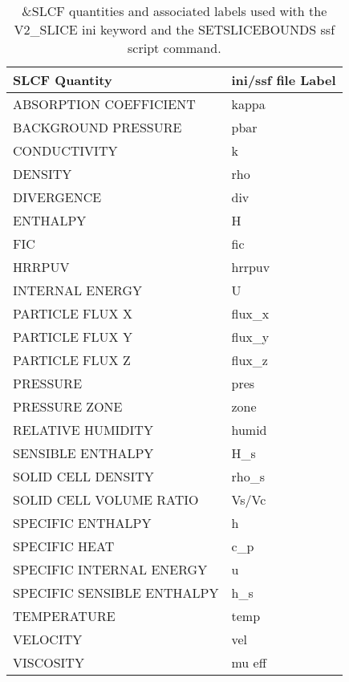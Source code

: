 \begin{table}[bph]
\begin{center}
\caption{\&SLCF quantities and associated labels used with the V2\_SLICE ini keyword and the SETSLICEBOUNDS ssf script command.}
\vspace{0.1in}
\begin{tabular}{|l|l|}
\hline
SLCF Quantity & ini/ssf file Label \\ \hline
 ABSORPTION COEFFICIENT  &   kappa \\ \hline
 BACKGROUND PRESSURE  &   pbar \\ \hline
 CONDUCTIVITY  &   k \\ \hline
 DENSITY  &   rho \\ \hline
 DIVERGENCE  &   div \\ \hline
 ENTHALPY  &   H \\ \hline
 FIC  &   fic \\ \hline
 HRRPUV  &   hrrpuv \\ \hline
 INTERNAL ENERGY  &   U \\ \hline
 PARTICLE FLUX X  &   flux\_x \\ \hline
 PARTICLE FLUX Y  &   flux\_y \\ \hline
 PARTICLE FLUX Z  &   flux\_z \\ \hline
 PRESSURE  &   pres \\ \hline
 PRESSURE ZONE  &   zone \\ \hline
 RELATIVE HUMIDITY  &   humid \\ \hline
 SENSIBLE ENTHALPY  &   H\_s \\ \hline
 SOLID CELL DENSITY  &   rho\_s \\ \hline
 SOLID CELL VOLUME RATIO  &   Vs/Vc \\ \hline
 SPECIFIC ENTHALPY  &   h \\ \hline
 SPECIFIC HEAT  &   c\_p \\ \hline
 SPECIFIC INTERNAL ENERGY  &   u \\ \hline
 SPECIFIC SENSIBLE ENTHALPY  &   h\_s \\ \hline
 TEMPERATURE  &   temp \\ \hline
 VELOCITY  &   vel \\ \hline
 VISCOSITY  &   mu eff \\ \hline
\end{tabular}
\label{tabSLCF}
\end{center}
\end{table}
